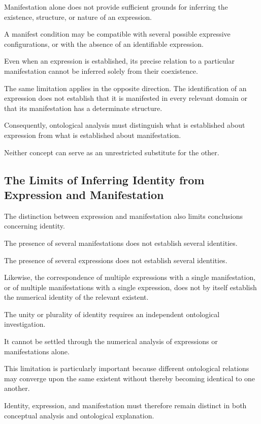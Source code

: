 Manifestation alone does not provide sufficient grounds
for inferring the existence, structure, or nature of
an expression.

A manifest condition may be compatible with several
possible expressive configurations, or with the absence
of an identifiable expression.

Even when an expression is established, its precise
relation to a particular manifestation cannot be inferred
solely from their coexistence.

The same limitation applies in the opposite direction.
The identification of an expression does not establish
that it is manifested in every relevant domain or that
its manifestation has a determinate structure.

Consequently, ontological analysis must distinguish
what is established about expression from what is
established about manifestation.

Neither concept can serve as an unrestricted substitute
for the other.

\subsection{The Limits of Inferring Identity from Expression and Manifestation}

The distinction between expression and manifestation
also limits conclusions concerning identity.

The presence of several manifestations does not establish
several identities.

The presence of several expressions does not establish
several identities.

Likewise, the correspondence of multiple expressions
with a single manifestation, or of multiple manifestations
with a single expression, does not by itself establish
the numerical identity of the relevant existent.

The unity or plurality of identity requires an independent
ontological investigation.

It cannot be settled through the numerical analysis
of expressions or manifestations alone.

This limitation is particularly important because
different ontological relations may converge upon the
same existent without thereby becoming identical to
one another.

Identity, expression, and manifestation must therefore
remain distinct in both conceptual analysis and
ontological explanation.

